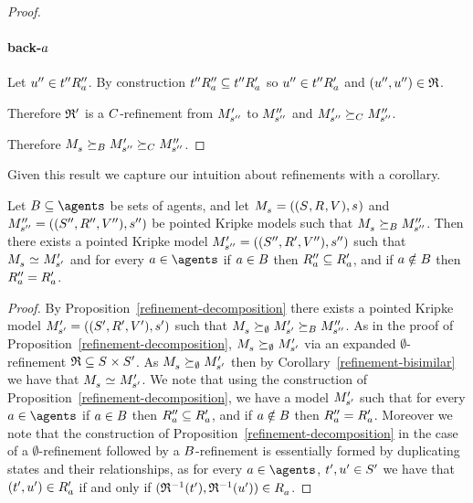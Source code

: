 \begin{proof}
\paragraph{back-$a$}
Let ${u}^{\prime\prime} \in {{t}^{\prime\prime}} {R^{\prime\prime}_{a}}$.
By construction ${{t}^{\prime\prime}} {R^{\prime\prime}_{a}} \subseteq {{t}^{\prime\prime}} {R^{\prime}_{a}}$ so ${u}^{\prime\prime} \in {{t}^{\prime\prime}} {R^{\prime}_{a}}$ and $({u}^{\prime\prime}, {u}^{\prime\prime}) \in \mathfrak{R}$.

Therefore $\mathfrak{R}'$ is a $C$-refinement from ${M^{\prime}_{{s}^{\prime\prime}}}$ to ${M^{\prime\prime}_{{s}^{\prime\prime}}}$ and ${M^{\prime}_{{s}^{\prime\prime}}} \succeq_{C} {M^{\prime\prime}_{{s}^{\prime\prime}}}$.

Therefore $\kPModel{\kStateS} \simulatesBs \kPModelP{\kStateSPP} \simulatesCs \kPModelPP{\kStateSPP}$.
\end{proof}

Given this result we capture our intuition about refinements with a corollary.

\begin{corollary}\label{refinement-subrelations}
Let $\agentsB \subseteq \agents$ be sets of agents, and let $\kPModelAndTuple{\kStateS}$ and $\kPModelAndTuplePP{\kStateSPP}$ be pointed Kripke models such that $\kPModel{\kStateS} \simulatesBs \kPModelPP{\kStateSPP}$.
Then there exists a pointed Kripke model ${M^{\prime}_{{s}^{\prime\prime}}} = (({S^{\prime\prime}}, {R^{\prime}_{}}, {V^{\prime\prime}}), {s}^{\prime\prime})$ such that $\kPModel{\kStateS} \bisimilar \kPModelP{\kStateSP}$ and for every $\agentA \in \agents$ if $a \in B$ then ${R^{\prime\prime}_{a}} \subseteq {R^{\prime}_{a}}$, and if $a \notin B$ then ${R^{\prime\prime}_{a}} = {R^{\prime}_{a}}$.
\end{corollary}

\begin{proof}
By Proposition~\ref{refinement-decomposition} there exists a pointed Kripke model $\kPModelAndTupleP{\kStateSP}$ such that $\kPModel{\kStateS} \simulates[\emptyset] \kPModelP{\kStateSP} \simulatesBs \kPModelPP{\kStateSPP}$.
As in the proof of Proposition~\ref{refinement-decomposition}, $\kPModel{\kStateS} \simulates[\emptyset] \kPModelP{\kStateSP}$ via an expanded $\emptyset$-refinement $\refinement \subseteq \kStates \times \kStatesP$.
As $\kPModel{\kStateS} \simulates[\emptyset] \kPModelP{\kStateSP}$ then by Corollary~\ref{refinement-bisimilar} we have that $\kPModel{\kStateS} \bisimilar \kPModelP{\kStateSP}$.
We note that using the construction of Proposition~\ref{refinement-decomposition}, we have a model ${M^{\prime}_{{s}^{\prime}}}$ such that for every $\agentA \in \agents$ if $a \in B$ then ${R^{\prime\prime}_{a}} \subseteq {R^{\prime}_{a}}$, and if $a \notin B$ then ${R^{\prime\prime}_{a}} = {R^{\prime}_{a}}$.
Moreover we note that the construction of Proposition~\ref{refinement-decomposition} in the case of a $\emptyset$-refinement followed by a $B$-refinement is essentially formed by duplicating states and their relationships, as for every $\agentA \in \agents$, ${t}^{\prime}, {u}^{\prime} \in {S^{\prime}}$ we have that $({t}^{\prime}, {u}^{\prime}) \in {R^{\prime}_{a}}$ if and only if $(\refinement^{-1}(\kStateTP), \refinement^{-1}(\kStateUP)) \in \kAccessibilityA$.
\end{proof}


